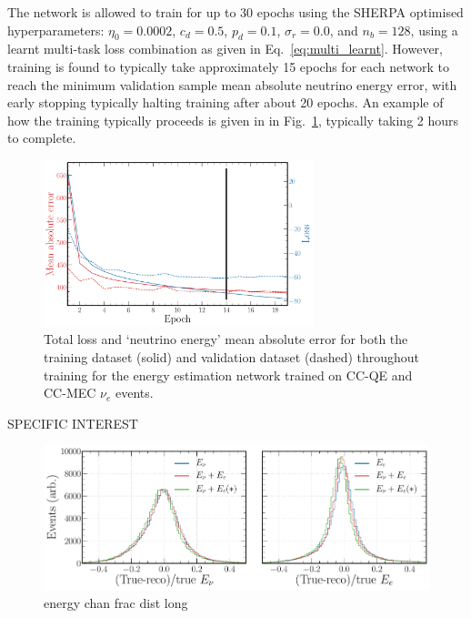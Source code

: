The network is allowed to train for up to 30 epochs using the SHERPA optimised hyperparameters:
$\eta_{0}=0.0002$, $c_{d}=0.5$, $p_{d}=0.1$, $\sigma_{r}=0.0$, and $n_{b}=128$, using a learnt
multi-task loss combination as given in Eq.~\ref{eq:multi_learnt}. However, training is found to
typically take approximately 15 epochs for each network to reach the minimum validation sample
mean absolute neutrino energy error, with early stopping typically halting training after about 20
epochs. An example of how the training typically proceeds is given in in
Fig.~\ref{fig:final_energy_history}, typically taking 2 hours to complete.

\begin{figure} %
    \includegraphics[width=0.7\textwidth]{diagrams/6-cvn/chipsnet/final_energy_history.pdf}
    \caption[Loss and mean absolute error throughout training for the beam classification network.]
    {Total loss and `neutrino energy' mean absolute error for both the training dataset (solid)
        and validation dataset (dashed) throughout training for the energy estimation network
        trained on CC-QE and CC-MEC $\nu_{e}$ events.}
    \label{fig:final_energy_history}
\end{figure}

SPECIFIC INTEREST
\begin{figure} %
    \includegraphics[width=\textwidth]{diagrams/6-cvn/chipsnet/energy_chan_frac_dist.pdf}
    \caption[energy chan frac dist short]
    {energy chan frac dist long}
    \label{fig:energy_chan_frac_dist}
\end{figure}

